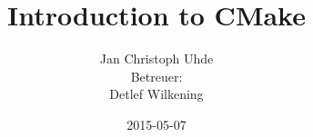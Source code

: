 \documentclass[compress]{beamer}
\title{Introduction to CMake}
\author[Jan Christoph Uhde]{Jan Christoph Uhde\\{\vspace{0.5cm} \tiny Betreuer:\\Detlef Wilkening}}
\date{2015-05-07}
\begin{document}
\frame{\titlepage}

\section[Overview]{}
\frame{\tableofcontents}


\end{document}
